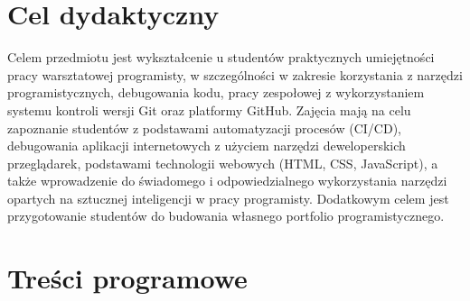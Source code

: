 \documentclass[12pt, a4paper]{article}
\begin{document}
\section{Cel dydaktyczny}

Celem przedmiotu jest wykształcenie u studentów praktycznych umiejętności pracy warsztatowej programisty, w szczególności w zakresie korzystania z narzędzi programistycznych, debugowania kodu, pracy zespołowej z wykorzystaniem systemu kontroli wersji Git oraz platformy GitHub. Zajęcia mają na celu zapoznanie studentów z podstawami automatyzacji procesów (CI/CD), debugowania aplikacji internetowych z użyciem narzędzi deweloperskich przeglądarek, podstawami technologii webowych (HTML, CSS, JavaScript), a także wprowadzenie do świadomego i odpowiedzialnego wykorzystania narzędzi opartych na sztucznej inteligencji w pracy programisty. Dodatkowym celem jest przygotowanie studentów do budowania własnego portfolio programistycznego.

\section{Treści programowe}
\end{document}
